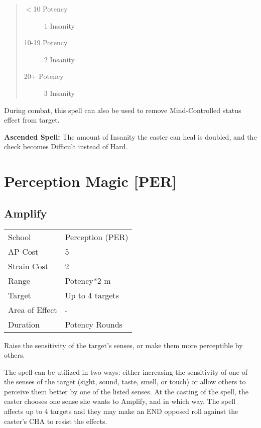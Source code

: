 \documentclass[11pt,a4paper,twocolumn]{book}
\begin{document}
\begin{quote}
	\begin{description}
		\item[$<$10 Potency] 	1 Insanity
		\item[10-19 Potency] 	2 Insanity
		\item[20+ Potency] 	    3 Insanity	
	\end{description}	
\end{quote}

During combat, this spell can also be used to remove Mind-Controlled status effect from target.

\bigskip

\textbf{Ascended Spell:} The amount of Insanity the caster can heal is doubled, and the check becomes Difficult instead of Hard.

\vfill

\section*{Perception Magic [PER]}

\subsection*{Amplify}
{
	\begin{tabu} to 75mm{| X[l,4] | X[l,7] |}
		\hline
		School 			& Perception (PER) \\
		AP Cost	      	& 5 				\\
		Strain Cost     & 2 				\\
		Range     		& Potency*2 m 		\\
		Target      	& Up to 4 targets 	\\
		Area of Effect  & - 	 			\\
		Duration     	& Potency Rounds 	\\ \hline
	\end{tabu}
	
}

\medskip

Raise the sensitivity of the target's senses, or make them more perceptible by others.

The spell can be utilized in two ways: either increasing the sensitivity of one of the senses of the target (sight, sound, taste, smell, or touch) or allow others to perceive them better by one of the listed senses. At the casting of the spell, the caster chooses one sense she wants to Amplify, and in which way. The spell affects up to 4 targets and they may make an END opposed roll against the caster's CHA to resist the effects.
\end{document}
